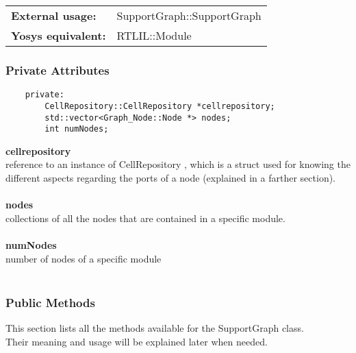 \documentclass{article}
\begin{document}
\begin{tabular}{ll}
	\textbf{External usage: } & SupportGraph::SupportGraph\\
	\textbf{Yosys equivalent: } & RTLIL::Module\\
\end{tabular}

\subsubsection{Private Attributes}

\begin{mdframed}[hidealllines=true, backgroundcolor=magenta!10]
	\begin{lstlisting}
	private:
		CellRepository::CellRepository *cellrepository;
		std::vector<Graph_Node::Node *> nodes;
		int numNodes;
	\end{lstlisting}
\end{mdframed}

\textbf{cellrepository}\\
reference to an instance of CellRepository , which is a struct used for knowing the different aspects regarding the ports of a node (explained in a farther section).\\\\

\textbf{nodes}\\
collections of all the nodes that are contained in a specific module.\\\\

\textbf{numNodes}\\
number of nodes of a specific module\\\\


\subsubsection{Public Methods}

This section lists all the methods available for the SupportGraph class.\\
Their meaning and usage will be explained later when needed.\\
\end{document}
